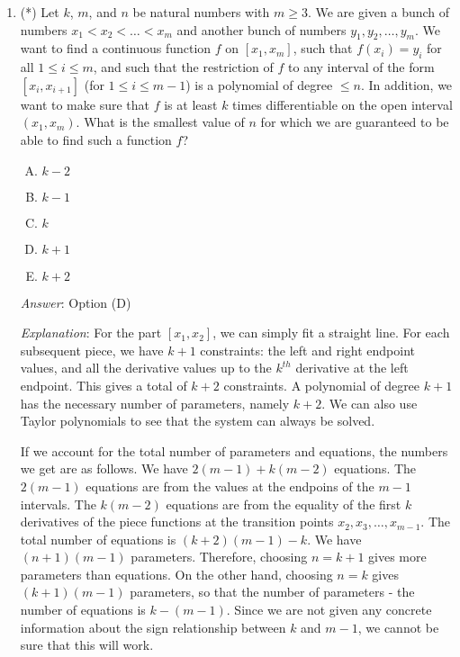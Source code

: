 \documentclass[10pt]{amsart}
\begin{document}
\begin{enumerate}
  {\em Historical note (last time)}: $11$ out
  of $29$ got this. $10$ chose (B), $6$ chose (D), $2$ chose (A).

\item (*) Let $k$, $m$, and $n$ be natural numbers with $m \ge 3$. We are
  given a bunch of numbers $x_1< x_2< \dots<x_m$ and another bunch of
  numbers $y_1,y_2,\dots,y_m$. We want to find a continuous function
  $f$ on $[x_1,x_m]$, such that $f(x_i) = y_i$ for all $1 \le i \le
  m$, and such that the restriction of $f$ to any interval of the form
  $[x_i,x_{i+1}]$ (for $1 \le i \le m - 1$) is a polynomial of degree
  $\le n$. In addition, we want to make sure that $f$ is at least $k$
  times differentiable on the open interval $(x_1,x_m)$. What is the
  smallest value of $n$ for which we are guaranteed to be able to find
  such a function $f$?

  \begin{enumerate}[(A)]
  \item $k - 2$
  \item $k - 1$
  \item $k$
  \item $k + 1$
  \item $k + 2$
  \end{enumerate}

  {\em Answer}: Option (D)

  {\em Explanation}: For the part $[x_1,x_2]$, we can simply fit a
  straight line. For each subsequent piece, we have $k + 1$
  constraints: the left and right endpoint values, and all the
  derivative values up to the $k^{th}$ derivative at the left
  endpoint. This gives a total of $k + 2$ constraints. A polynomial of
  degree $k + 1$ has the necessary number of parameters, namely $k +
  2$. We can also use Taylor polynomials to see that the system can
  always be solved.

  If we account for the total number of parameters and equations, the
  numbers we get are as follows. We have $2(m - 1) + k(m - 2)$
  equations. The $2(m - 1)$ equations are from the values at the
  endpoins of the $m - 1$ intervals. The $k(m - 2)$ equations are from
  the equality of the first $k$ derivatives of the piece functions at
  the transition points $x_2,x_3,\dots,x_{m-1}$. The total number of
  equations is $(k + 2)(m - 1) - k$. We have $(n + 1)(m - 1)$
  parameters. Therefore, choosing $n = k + 1$ gives more parameters
  than equations. On the other hand, choosing $n = k$ gives $(k + 1)(m
  - 1)$ parameters, so that the number of parameters - the number of
  equations is $k - (m - 1)$. Since we are not given any concrete
  information about the sign relationship between $k$ and $m - 1$, we
  cannot be sure that this will work.


\end{enumerate}
\end{document}
